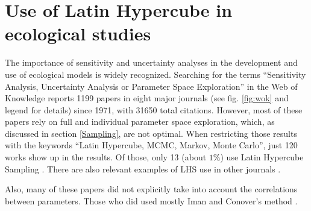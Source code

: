 \section{Use of Latin Hypercube in ecological studies}\label{Studies}
The importance of sensitivity and uncertainty analyses in the development 
and use of ecological models is widely recognized. Searching for the terms
``Sensitivity Analysis, Uncertainty Analysis or Parameter Space
Exploration'' in the Web of Knowledge reports 1199 papers in eight major
journals (see fig. \ref{fig:wok} and legend for details) since 1971, 
with 31650 total
citations. However,
most of these papers rely on full and individual parameter space
exploration, which, as discussed in section \ref{Sampling}, are not
optimal. When restricting those results with the keywords ``Latin Hypercube,
MCMC, Markov, Monte Carlo'', just 120 works show up in the results. Of 
those, only 13 (about $1\%$) use Latin Hypercube Sampling 
\cite{Berthaume12, Confalonieri10, Meyer07, Tiemeyer07, Xu05,
Moore04, Shirley03, Duschesne03, Reed84, Marino08, Nathan01, Hamilton10,
Lovvorn96}. There are also relevant examples of LHS use in other
journals \cite{Estill12, Fisher10, Thebault10}.

Also, many of these papers did not explicitly take into account the
correlations between parameters. Those who did used mostly Iman and 
Conover's method \cite{ImanConover82}. 

